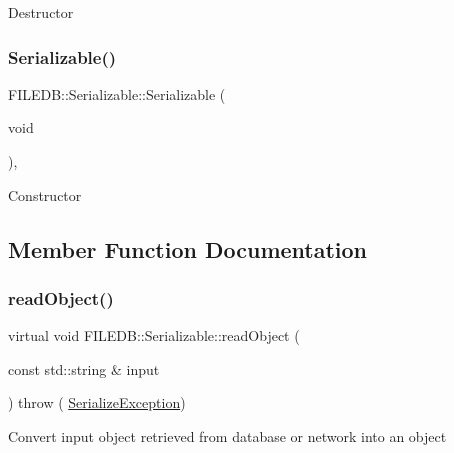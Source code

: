 Destructor \mbox{\label{classFILEDB_1_1Serializable_a09ab427f4720be7429003f4c78adda16}} 
\subsubsection{\texorpdfstring{Serializable()}{Serializable()}\hspace{0.1cm}{\footnotesize\ttfamily [3/3]}}
{\footnotesize\ttfamily F\+I\+L\+E\+D\+B\+::\+Serializable\+::\+Serializable (\begin{DoxyParamCaption}\item[{void}]{ }\end{DoxyParamCaption})\hspace{0.3cm}{\ttfamily [inline]}, {\ttfamily [protected]}}

Constructor 

\subsection{Member Function Documentation}
\mbox{\label{classFILEDB_1_1Serializable_a21a5831fa4f65790490a8a5eba9fcab2}} 
\subsubsection{\texorpdfstring{readObject()}{readObject()}\hspace{0.1cm}{\footnotesize\ttfamily [1/3]}}
{\footnotesize\ttfamily virtual void F\+I\+L\+E\+D\+B\+::\+Serializable\+::read\+Object (\begin{DoxyParamCaption}\item[{const std\+::string \&}]{input }\end{DoxyParamCaption}) throw ( \mbox{\hyperlink{classFILEDB_1_1SerializeException}{Serialize\+Exception}}) \hspace{0.3cm}{\ttfamily [pure virtual]}}

Convert input object retrieved from database or network into an object 

